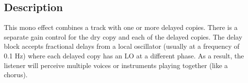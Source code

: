 \subsection{Description}
This mono effect combines a track with one or more delayed copies. There is a separate gain control for the dry copy and each of the delayed copies. The delay block accepts fractional delays from a local oscillator (usually at a frequency of 0.1 Hz) where each delayed copy has an LO at a different phase. As a result, the listener will perceive multiple voices or instruments playing together (like a chorus).